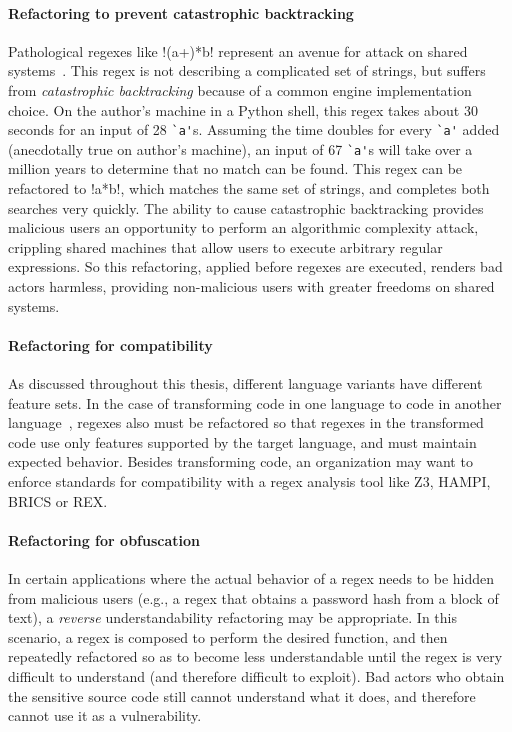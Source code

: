\paragraph{Refactoring to prevent catastrophic backtracking}  Pathological regexes like \cverb!(a+)*b! represent an avenue for attack on shared systems~\cite{Kirrage2013}.  This regex is not describing a complicated set of strings, but suffers from \emph{catastrophic backtracking} because of a common engine implementation choice.  On the author's machine in a Python shell, this regex takes about 30 seconds for an input of 28 \verb!`a'!s. Assuming the time doubles for every \verb!`a'! added (anecdotally true on author's machine), an input of 67 \verb!`a'!s will take over a million years to determine that no match can be found.  This regex can be refactored to \cverb!a*b!, which matches the same set of strings, and completes both searches very quickly.  The ability to cause catastrophic backtracking provides malicious users an opportunity to perform an algorithmic complexity attack, crippling shared machines that allow users to execute arbitrary regular expressions.  So this refactoring, applied before regexes are executed, renders bad actors harmless, providing non-malicious users with greater freedoms on shared systems.

\paragraph{Refactoring for compatibility}  As discussed throughout this thesis, different language variants have different feature sets.  In the case of transforming code in one language to code in another language~\cite{7372046}, regexes also must be refactored so that regexes in the transformed code use only features supported by the target language, and must maintain expected behavior.  Besides transforming code, an organization may want to enforce standards for compatibility with a regex analysis tool like Z3, HAMPI, BRICS or REX.

\paragraph{Refactoring for obfuscation}  In certain applications where the actual behavior of a regex needs to be hidden from malicious users (e.g., a regex that obtains a password hash from a block of text), a \emph{reverse} understandability refactoring may be appropriate.  In this scenario, a regex is composed to perform the desired function, and then repeatedly refactored so as to become less understandable until the regex is very difficult to understand (and therefore difficult to exploit).  Bad actors who obtain the sensitive source code still cannot understand what it does, and therefore cannot use it as a vulnerability.

